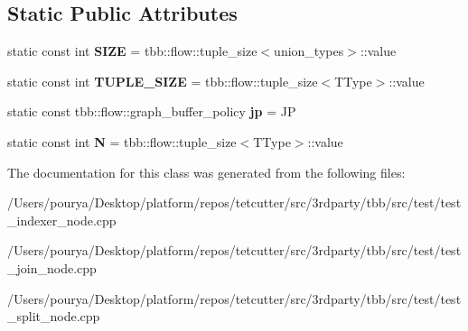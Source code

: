 \subsection*{Static Public Attributes}
\begin{DoxyCompactItemize}
\item 
\hypertarget{classparallel__test_a577cff593ad8114cc8330aa5f6241624}{}static const int {\bfseries S\+I\+Z\+E} = tbb\+::flow\+::tuple\+\_\+size$<$union\+\_\+types$>$\+::value\label{classparallel__test_a577cff593ad8114cc8330aa5f6241624}

\item 
\hypertarget{classparallel__test_a950a2314c311436fcf0b644adf7117f3}{}static const int {\bfseries T\+U\+P\+L\+E\+\_\+\+S\+I\+Z\+E} = tbb\+::flow\+::tuple\+\_\+size$<$T\+Type$>$\+::value\label{classparallel__test_a950a2314c311436fcf0b644adf7117f3}

\item 
\hypertarget{classparallel__test_a4b21d3ebff9c15933d788ac4250cbfa8}{}static const tbb\+::flow\+::graph\+\_\+buffer\+\_\+policy {\bfseries jp} = J\+P\label{classparallel__test_a4b21d3ebff9c15933d788ac4250cbfa8}

\item 
\hypertarget{classparallel__test_a38e4c71e7f9961b89ee19135e1c99b7e}{}static const int {\bfseries N} = tbb\+::flow\+::tuple\+\_\+size$<$T\+Type$>$\+::value\label{classparallel__test_a38e4c71e7f9961b89ee19135e1c99b7e}

\end{DoxyCompactItemize}


The documentation for this class was generated from the following files\+:\begin{DoxyCompactItemize}
\item 
/\+Users/pourya/\+Desktop/platform/repos/tetcutter/src/3rdparty/tbb/src/test/test\+\_\+indexer\+\_\+node.\+cpp\item 
/\+Users/pourya/\+Desktop/platform/repos/tetcutter/src/3rdparty/tbb/src/test/test\+\_\+join\+\_\+node.\+cpp\item 
/\+Users/pourya/\+Desktop/platform/repos/tetcutter/src/3rdparty/tbb/src/test/test\+\_\+split\+\_\+node.\+cpp\end{DoxyCompactItemize}
